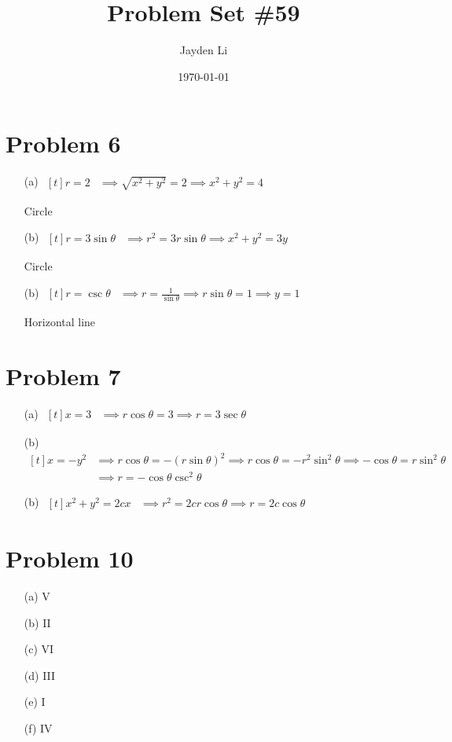 \documentclass[preview, margin=0.6in]{standalone}
\title{\vspace*{-40pt}Problem Set \#59}
\author{Jayden Li}
\date{\today}
\newcommand*{\problem}[1]{\section*{Problem #1}}
\begin{document}
\fontsize{12pt}{12pt}\selectfont
\setlength{\abovedisplayskip}{\abovedisplayskip/2}
\setlength{\belowdisplayskip}{\belowdisplayskip/2}
\setlength{\parindent}{0pt}
\setlength{\parskip}{2ex plus 0.5ex minus 0.2ex}
\maketitle

\problem{6}
\begin{itemize}
	\item[(a)]
		$\begin{aligned}[t]
		    r=2
			&\implies \sqrt{x^2+y^2}=2
			\implies x^2+y^2=4
		\end{aligned}$

		Circle
	
	\item[(b)]
		$\begin{aligned}[t]
			r=3\sin \theta
			&\implies r^2=3r\sin\theta
			\implies x^2+y^2=3y
		\end{aligned}$

		Circle
	
	\item[(b)]
		$\begin{aligned}[t]
		    r=\csc\theta
			&\implies r=\frac{1}{\sin\theta}
			\implies r\sin\theta=1
			\implies y=1
		\end{aligned}$

		Horizontal line
\end{itemize}

\problem{7}
\begin{itemize}
	\item[(a)]
		$\begin{aligned}[t]
		    x=3
			&\implies r\cos\theta=3
			\implies \boxed{r=3\sec\theta}
		\end{aligned}$
	
	\item[(b)]
		$\begin{aligned}[t]
		    x=-y^2
			&\implies r\cos \theta=- \left(r\sin\theta\right)^2
			\implies r\cos\theta=-r^2\sin^2\theta
			\implies -\cos\theta=r\sin^2\theta \\
			&\implies \boxed{r=-\cos\theta \csc^2\theta}
		\end{aligned}$
	
	\item[(b)]
		$\begin{aligned}[t]
			x^2+y^2=2cx
			&\implies r^2=2cr\cos \theta
			\implies \boxed{r=2c\cos\theta}
		\end{aligned}$
\end{itemize}

\problem{10}
\begin{itemize}
	\item[(a)] V

	\item[(b)] II

	\item[(c)] VI

	\item[(d)] III

	\item[(e)] I

	\item[(f)] IV

\end{itemize}
\end{document}
